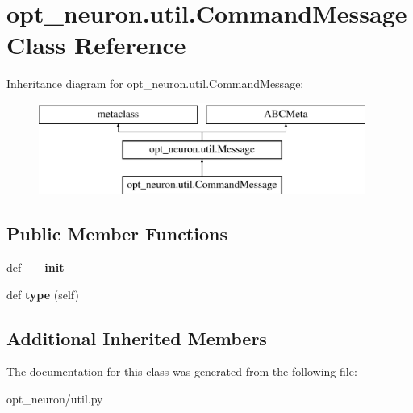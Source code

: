 \hypertarget{classopt__neuron_1_1util_1_1CommandMessage}{}\section{opt\+\_\+neuron.\+util.\+Command\+Message Class Reference}
\label{classopt__neuron_1_1util_1_1CommandMessage}
Inheritance diagram for opt\+\_\+neuron.\+util.\+Command\+Message\+:\begin{figure}[H]
\begin{center}
\leavevmode
\includegraphics[height=3.000000cm]{classopt__neuron_1_1util_1_1CommandMessage}
\end{center}
\end{figure}
\subsection*{Public Member Functions}
\begin{DoxyCompactItemize}
\item 
\hypertarget{classopt__neuron_1_1util_1_1CommandMessage_ac47ba4ba7dae61dc3a6c02c0d3f99c6c}{}def {\bfseries \+\_\+\+\_\+init\+\_\+\+\_\+}\label{classopt__neuron_1_1util_1_1CommandMessage_ac47ba4ba7dae61dc3a6c02c0d3f99c6c}

\item 
\hypertarget{classopt__neuron_1_1util_1_1CommandMessage_a012e016e20502d0b4b1eb652378192c7}{}def {\bfseries type} (self)\label{classopt__neuron_1_1util_1_1CommandMessage_a012e016e20502d0b4b1eb652378192c7}

\end{DoxyCompactItemize}
\subsection*{Additional Inherited Members}


The documentation for this class was generated from the following file\+:\begin{DoxyCompactItemize}
\item 
opt\+\_\+neuron/util.\+py\end{DoxyCompactItemize}

